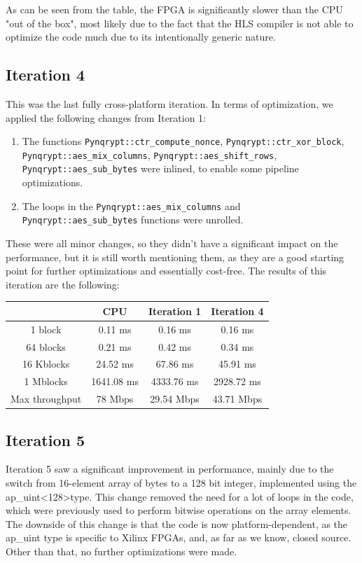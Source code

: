 \documentclass[12pt,oneside,a4paper]{article}
\begin{document}
As can be seen from the table, the FPGA is significantly slower than the CPU "out of the box", most likely due to the fact that the HLS compiler is not able to optimize the code much due to its intentionally generic nature.

\subsection{Iteration 4} \label{subsec:iter4}
This was the last fully cross-platform iteration.
In terms of optimization, we applied the following changes from Iteration 1:
\begin{enumerate}
	\item The functions {\tt Pynqrypt::ctr\_compute\_nonce}, {\tt Pynqrypt::ctr\_xor\_block}, {\tt Pynqrypt::aes\_mix\_columns}, {\tt Pynqrypt::aes\_shift\_rows}, \\ {\tt Pynqrypt::aes\_sub\_bytes} were inlined, to enable some pipeline optimizations.
	\item The loops in the {\tt Pynqrypt::aes\_mix\_columns} and {\tt Pynqrypt::aes\_sub\_bytes} functions were unrolled.
\end{enumerate}

These were all minor changes, so they didn't have a significant impact on the performance, but it is still worth mentioning them, as they are a good starting point for further optimizations and essentially cost-free.
The results of this iteration are the following:
\begin{table}[h!]
	\centering
	\begin{tabular}{cccc}
		\toprule
		 & CPU & Iteration 1 & Iteration 4 \\
		\midrule
		1 block & 0.11 ms & 0.16 ms & 0.16 ms \\
		64 blocks & 0.21 ms & 0.42 ms & 0.34 ms \\
		16 Kblocks & 24.52 ms & 67.86 ms & 45.91 ms \\
		1 Mblocks & 1641.08 ms & 4333.76 ms & 2928.72 ms \\
		Max throughput & 78 Mbps & 29.54 Mbps & 43.71 Mbps \\
		\bottomrule
	\end{tabular}
\end{table}

\subsection{Iteration 5} \label{subsec:iter5}
Iteration 5 saw a significant improvement in performance, mainly due to the switch from 16-element array of bytes to a 128 bit integer, implemented using the ap\_uint\textless128\textgreater type.
This change removed the need for a lot of loops in the code, which were previously used to perform bitwise operations on the array elements.
The downside of this change is that the code is now platform-dependent, as the ap\_uint type is specific to Xilinx FPGAs, and, as far as we know, closed source. Other than that, no further optimizations were made.
\end{document}
